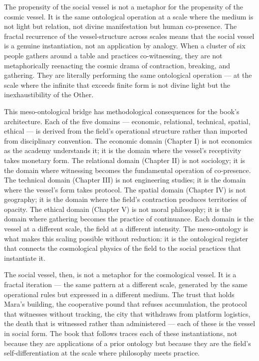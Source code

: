 The propensity of the social vessel is not a metaphor for the propensity of the cosmic vessel. It is the same ontological operation at a scale where the medium is not light but relation, not divine manifestation but human co-presence. The fractal recurrence of the vessel-structure across scales means that the social vessel is a genuine instantiation, not an application by analogy. When a cluster of six people gathers around a table and practices co-witnessing, they are not metaphorically reenacting the cosmic drama of contraction, breaking, and gathering. They are literally performing the same ontological operation — at the scale where the infinite that exceeds finite form is not divine light but the inexhaustibility of the Other.

This meso-ontological bridge has methodological consequences for the book's architecture. Each of the five domains — economic, relational, technical, spatial, ethical — is derived from the field's operational structure rather than imported from disciplinary convention. The economic domain (Chapter I) is not economics as the academy understands it; it is the domain where the vessel's receptivity takes monetary form. The relational domain (Chapter II) is not sociology; it is the domain where witnessing becomes the fundamental operation of co-presence. The technical domain (Chapter III) is not engineering studies; it is the domain where the vessel's form takes protocol. The spatial domain (Chapter IV) is not geography; it is the domain where the field's contraction produces territories of opacity. The ethical domain (Chapter V) is not moral philosophy; it is the domain where gathering becomes the practice of continuance. Each domain is the vessel at a different scale, the field at a different intensity. The meso-ontology is what makes this scaling possible without reduction: it is the ontological register that connects the cosmological physics of the field to the social practices that instantiate it.

The social vessel, then, is not a metaphor for the cosmological vessel. It is a fractal iteration — the same pattern at a different scale, generated by the same operational rules but expressed in a different medium. The trust that holds Mara's building, the cooperative pound that refuses accumulation, the protocol that witnesses without tracking, the city that withdraws from platform logistics, the death that is witnessed rather than administered — each of these is the vessel in social form. The book that follows traces each of these instantiations, not because they are applications of a prior ontology but because they are the field's self-differentiation at the scale where philosophy meets practice.

